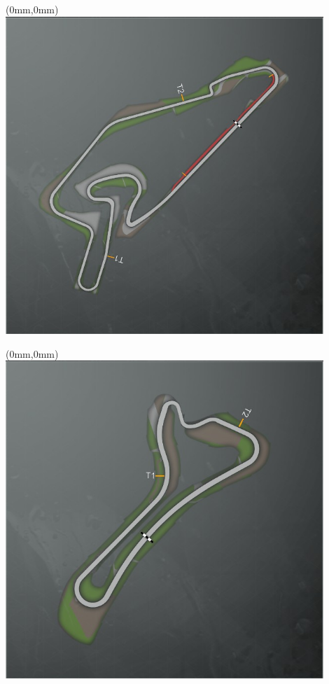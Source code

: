 \null\newpage
\begin{textblock*}{30mm}(0mm,0mm)%
\includegraphics[width=120mm]{TR/2015-05-20_00043.png}
\end{textblock*}
\null\newpage
\begin{textblock*}{30mm}(0mm,0mm)%
\includegraphics[width=120mm]{TR/2015-05-20_00042.png}
\end{textblock*}
